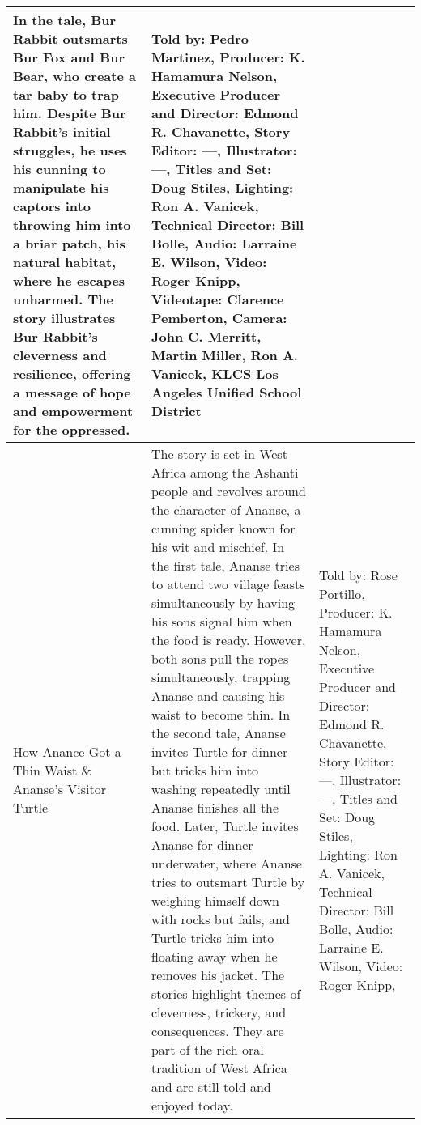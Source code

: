 \begin{table}[h]
\begin{small}
\begin{tabular}{|p{1.5cm}|p{8.5cm}|p{7cm}|}
            In the tale, Bur Rabbit outsmarts Bur Fox and Bur Bear, who create a tar baby to trap him.
            Despite Bur Rabbit's initial struggles, he uses his cunning to manipulate his captors into throwing him into a briar patch, his natural habitat, where he escapes unharmed.
            The story illustrates Bur Rabbit's cleverness and resilience, offering a message of hope and empowerment for the oppressed.
                                 &
            Told by: Pedro Martinez,
            Producer: K. Hamamura Nelson,
            Executive Producer and Director: Edmond R. Chavanette,
            Story Editor: ---,
            Illustrator: ---,
            Titles and Set: Doug Stiles,
            Lighting: Ron A. Vanicek,
            Technical Director: Bill Bolle,
            Audio: Larraine E. Wilson,
            Video: Roger Knipp,
            Videotape: Clarence Pemberton,
            Camera: John C. Merritt, Martin Miller, Ron A. Vanicek,
            KLCS Los Angeles Unified School District
            \\
            \hline
            How Anance Got a Thin Waist \& Ananse's Visitor Turtle
                                 &
            The story is set in West Africa among the Ashanti people and revolves around the character of Ananse, a cunning spider known for his wit and mischief.
            In the first tale, Ananse tries to attend two village feasts simultaneously by having his sons signal him when the food is ready.
            However, both sons pull the ropes simultaneously, trapping Ananse and causing his waist to become thin.
            In the second tale, Ananse invites Turtle for dinner but tricks him into washing repeatedly until Ananse finishes all the food.
            Later, Turtle invites Ananse for dinner underwater, where Ananse tries to outsmart Turtle by weighing himself down with rocks but fails, and Turtle tricks him into floating away when he removes his jacket.
            The stories highlight themes of cleverness, trickery, and consequences.
            They are part of the rich oral tradition of West Africa and are still told and enjoyed today.
                                 &
            Told by: Rose Portillo,
            Producer: K. Hamamura Nelson,
            Executive Producer and Director: Edmond R. Chavanette,
            Story Editor: ---,
            Illustrator: ---,
            Titles and Set: Doug Stiles,
            Lighting: Ron A. Vanicek,
            Technical Director: Bill Bolle,
            Audio: Larraine E. Wilson,
            Video: Roger Knipp,

\end{tabular}
\end{small}
\end{table}
